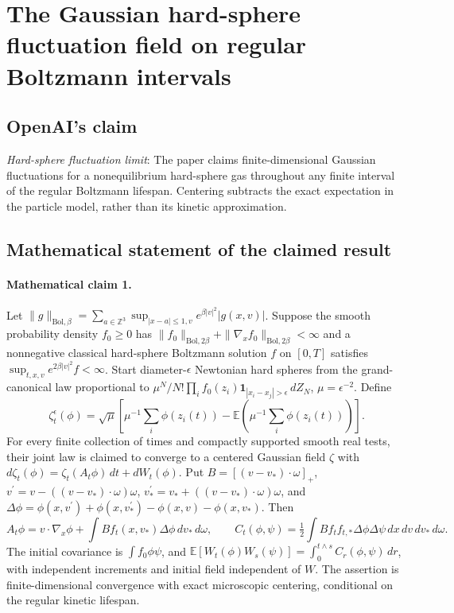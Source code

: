\documentclass[11pt]{article}
\begin{document}
\section*{The Gaussian hard-sphere fluctuation field on regular Boltzmann intervals}

\subsection{OpenAI's claim}
\textit{Hard-sphere fluctuation limit}: The paper claims finite-dimensional Gaussian fluctuations for a nonequilibrium hard-sphere gas throughout any finite interval of the regular Boltzmann lifespan. Centering subtracts the exact expectation in the particle model, rather than its kinetic approximation.

\subsection{Mathematical statement of the claimed result}
\paragraph{Mathematical claim 1.} Let $\|g\|_{\mathrm{Bol},\beta}=\sum_{a\in\mathbb Z^3}\sup_{|x-a|\le1,v}e^{\beta|v|^2}|g(x,v)|$. Suppose the smooth probability density $f_0\ge0$ has $\|f_0\|_{\mathrm{Bol},2\beta}+\|\nabla_xf_0\|_{\mathrm{Bol},2\beta}<\infty$ and a nonnegative classical hard-sphere Boltzmann solution $f$ on $[0,T]$ satisfies $\sup_{t,x,v}e^{2\beta|v|^2}f<\infty$. Start diameter-$\epsilon$ Newtonian hard spheres from the grand-canonical law proportional to $\mu^N/N!\prod_if_0(z_i)\mathbf1_{|x_i-x_j|>\epsilon}\,dZ_N$, $\mu=\epsilon^{-2}$. Define \[\zeta_t^\epsilon(\phi)=\sqrt\mu\left[\mu^{-1}\sum_i\phi(z_i(t))-\mathbb E\left(\mu^{-1}\sum_i\phi(z_i(t))\right)\right].\] For every finite collection of times and compactly supported smooth real tests, their joint law is claimed to converge to a centered Gaussian field $\zeta$ with $d\zeta_t(\phi)=\zeta_t(A_t\phi)\,dt+dW_t(\phi)$. Put $B=[(v-v_*)\cdot\omega]_+$, $v^\prime=v-((v-v_*)\cdot\omega)\omega$, $v_*^\prime=v_*+((v-v_*)\cdot\omega)\omega$, and $\Delta\phi=\phi(x,v^\prime)+\phi(x,v_*^\prime)-\phi(x,v)-\phi(x,v_*)$. Then \[A_t\phi=v\cdot\nabla_x\phi+\int Bf_t(x,v_*)\Delta\phi\,dv_*\,d\omega,\qquad C_t(\phi,\psi)=\tfrac12\int Bf_tf_{t,*}\Delta\phi\Delta\psi\,dx\,dv\,dv_*\,d\omega.\] The initial covariance is $\int f_0\phi\psi$, and $\mathbb E[W_t(\phi)W_s(\psi)]=\int_0^{t\wedge s}C_r(\phi,\psi)\,dr$, with independent increments and initial field independent of $W$. The assertion is finite-dimensional convergence with exact microscopic centering, conditional on the regular kinetic lifespan.
\end{document}
